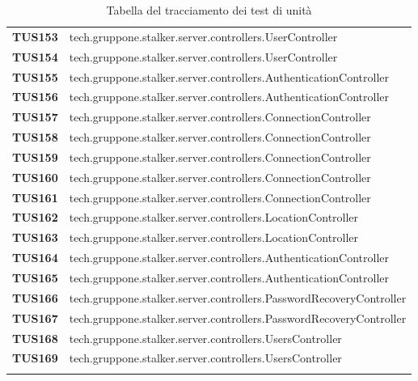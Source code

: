 \documentclass[../../piano-di-qualifica.tex]{subfiles}
\begin{document}
\begin{longtable}[H]{>{\centering\bfseries}m{3cm} >{}m{13cm}}
  TUS153 & tech.gruppone.stalker.server.controllers.UserController \\
  TUS154 & tech.gruppone.stalker.server.controllers.UserController \\
  TUS155 & tech.gruppone.stalker.server.controllers.AuthenticationController \\
  TUS156 & tech.gruppone.stalker.server.controllers.AuthenticationController \\
  TUS157 & tech.gruppone.stalker.server.controllers.ConnectionController \\
  TUS158 & tech.gruppone.stalker.server.controllers.ConnectionController \\
  TUS159 & tech.gruppone.stalker.server.controllers.ConnectionController \\
  TUS160 & tech.gruppone.stalker.server.controllers.ConnectionController \\
  TUS161 & tech.gruppone.stalker.server.controllers.ConnectionController \\
  TUS162 & tech.gruppone.stalker.server.controllers.LocationController \\
  TUS163 & tech.gruppone.stalker.server.controllers.LocationController \\
  TUS164 & tech.gruppone.stalker.server.controllers.AuthenticationController \\
  TUS165 & tech.gruppone.stalker.server.controllers.AuthenticationController \\
  TUS166 & tech.gruppone.stalker.server.controllers.PasswordRecoveryController \\
  TUS167 & tech.gruppone.stalker.server.controllers.PasswordRecoveryController \\
  TUS168 & tech.gruppone.stalker.server.controllers.UsersController \\
  TUS169 & tech.gruppone.stalker.server.controllers.UsersController \\

  \rowcolor{white}
  \caption{Tabella del tracciamento dei test di unità}%
  \label{tab:tabella_tracciamento_test_di_unita}
\end{longtable}


\end{document}
